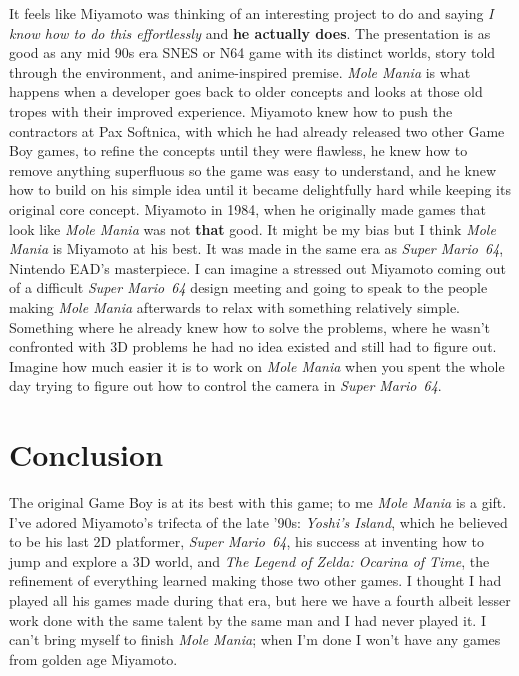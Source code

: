 \documentclass{book}
\begin{document}
It feels like Miyamoto was thinking of an interesting project to do and saying \emph{I know how to do this effortlessly} and \textbf{he actually does}. The presentation is as good as any mid 90s era SNES or N64 game with its distinct worlds, story told through the environment, and anime-inspired premise. \emph{Mole Mania} is what happens when a developer goes back to older concepts and looks at those old tropes with their improved experience. Miyamoto knew how to push the contractors at Pax Softnica, with which he had already released two other Game Boy games, to refine the concepts until they were flawless, he knew how to remove anything superfluous so the game was easy to understand, and he knew how to build on his simple idea until it became delightfully hard while keeping its original core concept. Miyamoto in 1984, when he originally made games that look like \emph{Mole Mania} was not \textbf{that} good. It might be my bias but I think \emph{Mole Mania} is Miyamoto at his best. It was made in the same era as \emph{Super Mario~64}, Nintendo EAD’s masterpiece. I can imagine a stressed out Miyamoto coming out of a difficult \emph{Super Mario~64} design meeting and going to speak to the people making \emph{Mole Mania} afterwards to relax with something relatively simple. Something where he already knew how to solve the problems, where he wasn’t confronted with 3D problems he had no idea existed and still had to figure out. Imagine how much easier it is to work on \emph{Mole Mania} when you spent the whole day trying to figure out how to control the camera in \emph{Super Mario~64}.\par
\FloatBarrier\section*{Conclusion}
The original Game Boy is at its best with this game; to me \emph{Mole Mania} is a gift. I’ve adored Miyamoto’s trifecta of the late ’90s: \emph{Yoshi’s Island}, which he believed to be his last 2D platformer, \emph{Super Mario~64}, his success at inventing how to jump and explore a 3D world, and \emph{The Legend of Zelda: Ocarina of Time}, the refinement of everything learned making those two other games. I thought I had played all his games made during that era, but here we have a fourth albeit lesser work done with the same talent by the same man and I had never played it. I can’t bring myself to finish \emph{Mole Mania}; when I’m done I won’t have any games from golden age Miyamoto.\par
\end{document}
